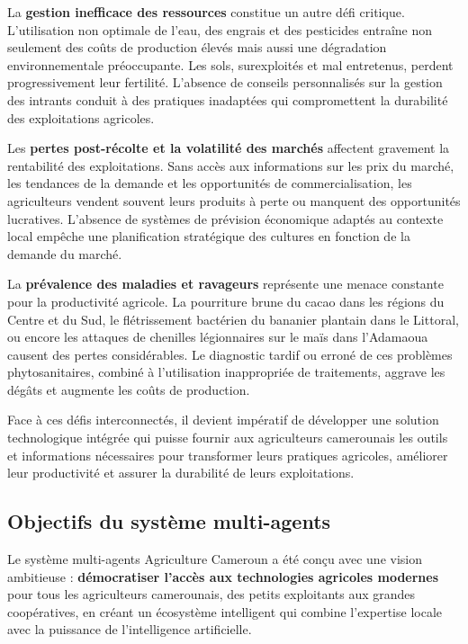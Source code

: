 La \textbf{gestion inefficace des ressources} constitue un autre défi critique. L'utilisation non optimale de l'eau, des engrais et des pesticides entraîne non seulement des coûts de production élevés mais aussi une dégradation environnementale préoccupante. Les sols, surexploités et mal entretenus, perdent progressivement leur fertilité. L'absence de conseils personnalisés sur la gestion des intrants conduit à des pratiques inadaptées qui compromettent la durabilité des exploitations agricoles.

Les \textbf{pertes post-récolte et la volatilité des marchés} affectent gravement la rentabilité des exploitations. Sans accès aux informations sur les prix du marché, les tendances de la demande et les opportunités de commercialisation, les agriculteurs vendent souvent leurs produits à perte ou manquent des opportunités lucratives. L'absence de systèmes de prévision économique adaptés au contexte local empêche une planification stratégique des cultures en fonction de la demande du marché.

La \textbf{prévalence des maladies et ravageurs} représente une menace constante pour la productivité agricole. La pourriture brune du cacao dans les régions du Centre et du Sud, le flétrissement bactérien du bananier plantain dans le Littoral, ou encore les attaques de chenilles légionnaires sur le maïs dans l'Adamaoua causent des pertes considérables. Le diagnostic tardif ou erroné de ces problèmes phytosanitaires, combiné à l'utilisation inappropriée de traitements, aggrave les dégâts et augmente les coûts de production.

Face à ces défis interconnectés, il devient impératif de développer une solution technologique intégrée qui puisse fournir aux agriculteurs camerounais les outils et informations nécessaires pour transformer leurs pratiques agricoles, améliorer leur productivité et assurer la durabilité de leurs exploitations.

\subsection{Objectifs du système multi-agents}

Le système multi-agents Agriculture Cameroun a été conçu avec une vision ambitieuse : \textbf{démocratiser l'accès aux technologies agricoles modernes} pour tous les agriculteurs camerounais, des petits exploitants aux grandes coopératives, en créant un écosystème intelligent qui combine l'expertise locale avec la puissance de l'intelligence artificielle.

